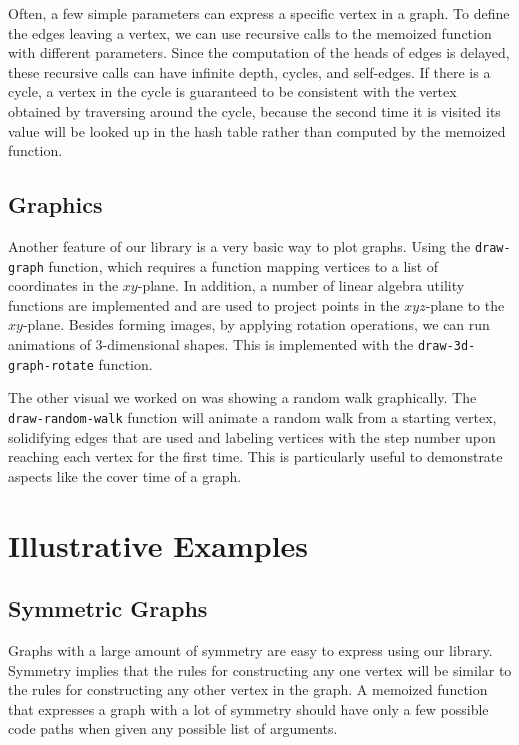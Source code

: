 \documentclass[11pt]{article} %
\theoremstyle{component}
\begin{document}
Often, a few simple parameters can express a specific vertex in a graph.  To define the edges leaving a vertex, we can use recursive calls to the memoized function with different parameters.  Since the computation of the heads of edges is delayed, these recursive calls can have infinite depth, cycles, and self-edges.  If there is a cycle, a vertex in the cycle is guaranteed to be consistent with the vertex obtained by traversing around the cycle, because the second time it is visited its value will be looked up in the hash table rather than computed by the memoized function.

\subsection{Graphics}

Another feature of our library is a very basic way to plot graphs. Using the \verb|draw-graph| function, which requires a function mapping vertices to a list of coordinates in the $xy$-plane. In addition, a number of linear algebra utility functions are implemented and are used to project points in the $xyz$-plane to the $xy$-plane. Besides forming images, by applying rotation operations, we can run animations of 3-dimensional shapes. This is implemented with the \verb|draw-3d-graph-rotate| function.

The other visual we worked on was showing a random walk graphically. The \verb|draw-random-walk| function will animate a random walk from a starting vertex, solidifying edges that are used and labeling vertices with the step number upon reaching each vertex for the first time. This is particularly useful to demonstrate aspects like the cover time of a graph.

\section{Illustrative Examples}
\label{sec:examples}

\subsection{Symmetric Graphs}

Graphs with a large amount of symmetry are easy to express using our library.  Symmetry implies that the rules for constructing any one vertex will be similar to the rules for constructing any other vertex in the graph.  A memoized function that expresses a graph with a lot of symmetry should have only a few possible code paths when given any possible list of arguments.
\end{document}
